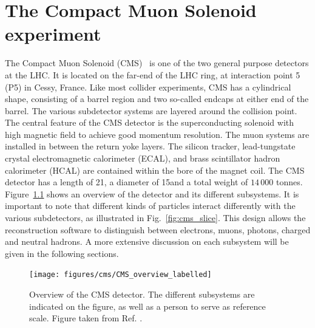 \chapter{The Compact Muon Solenoid experiment \label{chap:CMS}}

The Compact Muon Solenoid (CMS)~\cite{Chatrchyan:2008aa,Bayatian:922757,Ball:2007zza,CMS_website} is
one of the two general purpose detectors
at the LHC. It is
located on the far-end of the LHC ring, at interaction point 5 (P5) in Cessy, France. 
Like most collider experiments, CMS has a cylindrical shape, consisting of a barrel region and two
so-called endcaps at either end of the barrel. The various subdetector systems are layered around
the collision point. The central feature of the CMS detector is the superconducting solenoid with
high magnetic field to achieve good momentum resolution. The muon systems are installed in between
the return yoke layers. The silicon tracker, lead-tungstate crystal electromagnetic calorimeter
(ECAL), and brass scintillator hadron calorimeter (HCAL) are contained within the bore of the magnet
coil. 
The CMS detector has a length of 21\meter, a diameter of 15\meter and a total weight of $14\,000$
tonnes. 
Figure~\ref{fig:cms_overview} shows an overview of the detector and its different
subsystems. It is important to note that different kinds of particles interact differently with the
various subdetectors, as illustrated in Fig.~\ref{fig:cms_slice}. This design allows the
reconstruction software to distinguish between electrons, muons, photons, charged and neutral
hadrons. 
A more extensive discussion on each subsystem will be given in the
following sections. 

\begin{figure}[htpb]
  \centering
  \texttt{[image: figures/cms/CMS\_overview\_labelled]}
  \caption{Overview of the CMS detector. The different subsystems are indicated on the figure, as
well as a person to serve as reference scale. Figure taken from Ref. \cite{CMS_overview_labelled}.
  \label{fig:cms_overview}}
\end{figure}

